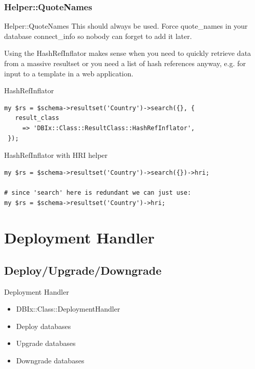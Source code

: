 \subsubsection{Helper::QuoteNames}

\begin{frame}{Helper::QuoteNames}
This should always be used. Force quote\_names in your database
connect\_info so nobody can forget to add it later.
\end{frame}

Using the HashRefInflator makes sense when you need to quickly retrieve
data from a massive resultset or you need a list of hash references anyway,
e.g. for input to a template in a web application.

\begin{frame}[fragile]{HashRefInflator}
\begin{lstlisting}
my $rs = $schema->resultset('Country')->search({}, {
   result_class
     => 'DBIx::Class::ResultClass::HashRefInflator',
 });
\end{lstlisting}
\end{frame}

\begin{frame}[fragile]{HashRefInflator with HRI helper}
\begin{lstlisting}
my $rs = $schema->resultset('Country')->search({})->hri;

# since 'search' here is redundant we can just use:
my $rs = $schema->resultset('Country')->hri;
\end{lstlisting}
\end{frame}


\section{Deployment Handler}

\subsection{Deploy/Upgrade/Downgrade}

\begin{frame}{Deployment Handler}
\begin{itemize}
\item DBIx::Class::DeploymentHandler
\item Deploy databases
\item Upgrade databases
\item Downgrade databases
\end{itemize}
\end{frame}

